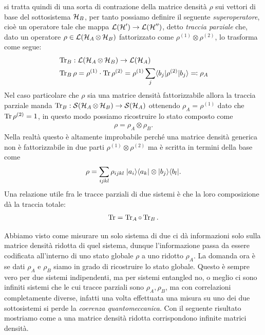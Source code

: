 si tratta quindi di una sorta di contrazione della matrice densità $ \rho $ sui vettori di base del sottosistema $ \operatorname{\mathcal{H}}_B $, per tanto possiamo definire 
il seguente \textit{superoperatore}, cioè un operatore tale che mappa $ \operatorname{\mathcal{L}}(\operatorname{\mathcal{H}}') \to \operatorname{\mathcal{L}}(\operatorname{\mathcal{H}}'') $, detto \textit{traccia parziale} che, dato un operatore 
$ \rho \in \operatorname{\mathcal{L}}(\operatorname{\mathcal{H}}_A \otimes \operatorname{\mathcal{H}}_B) $ fattorizzato come $ \rho^{(1)} \otimes \rho^{(2)} $, lo trasforma come segue: 
\begin{align*}
  &\operatorname{\textnormal{Tr}}_B : \operatorname{\mathcal{L}}(\operatorname{\mathcal{H}}_A \otimes \operatorname{\mathcal{H}}_B) \to \operatorname{\mathcal{L}}(\operatorname{\mathcal{H}}_A)
  \\
  &\operatorname{\textnormal{Tr}}_B\rho = \rho^{(1)} \cdot \operatorname{\textnormal{Tr}} \rho^{(2)} = \rho^{(1)} \sum_{j} \langle  b_j | \rho ^{(2)}| b_j \rangle \eqcolon \rho_A
\end{align*}
Nel caso particolare che $ \rho $ sia una matrice densità fattorizzabile allora la traccia parziale manda $ \operatorname{\textnormal{Tr}}_B : \mathcal{S}(\operatorname{\mathcal{H}}_A \otimes \operatorname{\mathcal{H}}_B) \to \mathcal{S}(\operatorname{\mathcal{H}}_A) $ 
ottenendo $ \rho_A = \rho^{(1)} $ dato che $ \operatorname{\textnormal{Tr}} \rho^{(2)} = 1 $, in questo modo possiamo ricostruire lo stato composto come 
\begin{align*}
  \rho = \rho_A \otimes \rho_B.
\end{align*}
Nella realtà questo è altamente improbabile perché una matrice densità generica non è fattorizzabile in due parti $ \rho^{(1)} \otimes \rho^{(2)} $ 
ma è scritta in termini della base come 
\begin{align*}
  \rho = \sum_{ijkl} \rho_{ijkl} \; \vert a_i \rangle \langle a_k \vert \otimes \vert b_j \rangle \langle b_l \vert.
\end{align*}
Una relazione utile fra le tracce parziali di due sistemi è che la loro composizione dà la traccia totale:
\begin{align*}
  \operatorname{\textnormal{Tr}} = \operatorname{\textnormal{Tr}}_A \circ \operatorname{\textnormal{Tr}}_B.
\end{align*}

Abbiamo visto come misurare un solo sistema di due ci dà informazioni solo sulla matrice densità ridotta di quel sistema, dunque l'informazione passa da 
essere codificata all'interno di uno stato globale $ \rho $ a uno ridotto $ \rho_A $. La domanda ora è se dati $ \rho_A $ e $ \rho_B $ siamo in grado 
di ricostruire lo stato globale. Questo è sempre vero per due sistemi indipendenti, ma per sistemi entangled no, o meglio ci sono infiniti sistemi 
che le cui tracce parziali sono $ \rho_A,\rho_B $, ma con correlazioni completamente diverse, infatti una volta effettuata una misura su uno dei due 
sottosistemi si perde la \textit{coerenza quantomeccanica}. Con il seguente risultato mostriamo come a una matrice densità ridotta corrispondono infinite 
matrici densità.

